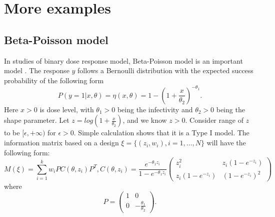 \documentclass[11pt]{amsart}
\theoremstyle{definition}
\theoremstyle{remark}
\begin{document}







\section{More examples}

 \subsection{Beta-Poisson model}

In  studies of binary dose response model, Beta-Poisson model is an important model \cite{haas1983}. The response $y$ follows a Bernoulli distribution with the expected success probability of the following form
\[
P(y=1|x,\theta) = \eta(x,\theta)= 1-(1+\frac{x}{\theta_2})^{-\theta_1}.
\]
 Here $x> 0$ is dose level, with $\theta_1>0$ being the infectivity and $\theta_2>0$ being the shape parameter. Let $z = log(1+\frac{x}{\theta_2})$, and we know $z>0$. Consider range of $z$ to be $[\epsilon,+\infty)$ for $\epsilon>0$. Simple calculation shows that it is a Type I model. The information matrix based on a design $\xi = \{(z_i,w_i), i=1,\ldots,N\}$ will have the following form: \begin{equation}
M(\xi) = \sum_{i=1}^{k} w_iP C(\theta,z_i)P^T,C(\theta,z_i) = \frac{e^{-\theta_1z_i}}{1-e^{-\theta_1z_i}}\left( \begin{array}{cc}
z_i^2 & z_i(1-e^{-z_i})\\
z_i(1-e^{-z_i}) & (1-e^{-z_i})^2
\end{array} \right) 
\end{equation} where \[P = \left( \begin{array}{cc}
1 & 0\\
0 & -\frac{\theta_1}{\theta_2}
\end{array} \right).\] 
\end{document}
